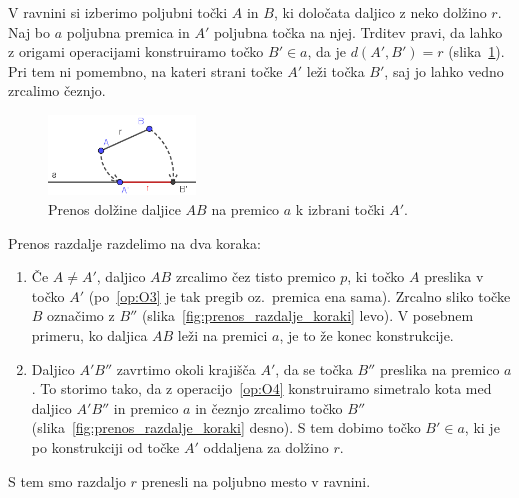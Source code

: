 \begin{dokaz}
    V ravnini si izberimo poljubni točki $A$ in $B$, ki določata daljico z neko dolžino $r$. Naj bo $a$ poljubna premica in $A'$ poljubna točka na njej. Trditev pravi, da lahko z origami operacijami konstruiramo točko $B' \in a$, da je $d(A', B') =r$ (slika~\ref{fig:prenos_razdalje_konec}). Pri tem ni pomembno, na kateri strani točke $A'$ leži točka $B'$, saj jo lahko vedno zrcalimo čeznjo.

    \begin{figure}[h]
        \centering
        \includegraphics[width=0.35\textwidth]{images/zrcaljenje_konec.png}
        \caption[Prenašanje razdalj z origamijem]{Prenos dolžine daljice $AB$ na premico $a$ k izbrani točki $A'$.}
        \label{fig:prenos_razdalje_konec}
    \end{figure}
    
    Prenos razdalje razdelimo na dva koraka:
    \begin{enumerate}
        \item Če $A \neq A'$, daljico $AB$ zrcalimo čez tisto premico $p$, ki točko $A$ preslika v točko $A'$ (po~\ref{op:O3} je tak pregib oz.\ premica ena sama). Zrcalno sliko točke $B$ označimo z $B''$ (slika~\ref{fig:prenos_razdalje_koraki} levo). V posebnem primeru, ko daljica $AB$ leži na premici $a$, je to že konec konstrukcije. 
        \item Daljico $A'B''$ zavrtimo okoli krajišča $A'$, da se točka $B''$ preslika na premico $a$. To storimo tako, da z operacijo~\ref{op:O4} konstruiramo simetralo kota med daljico $A'B''$ in premico $a$ in čeznjo zrcalimo točko $B''$ (slika~\ref{fig:prenos_razdalje_koraki} desno). S tem dobimo točko $B' \in a$, ki je po konstrukciji od točke $A'$ oddaljena za dolžino $r$.
    \end{enumerate}
    S tem smo razdaljo $r$ prenesli na poljubno mesto v ravnini.


\end{dokaz}
